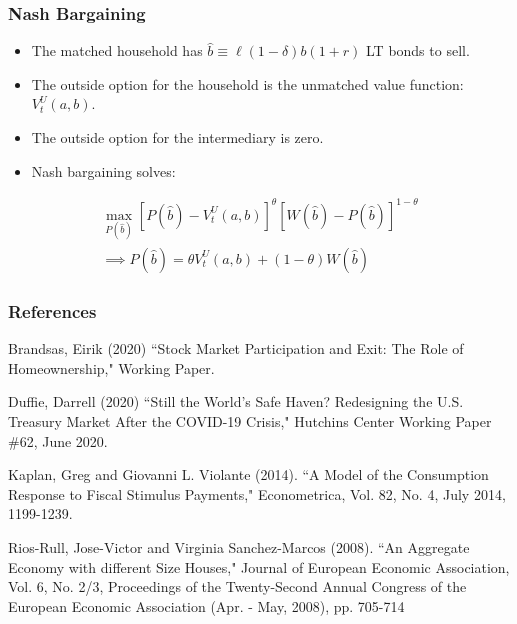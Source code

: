 \documentclass[handout]{beamer}
\begin{document}
\begin{frame}
\frametitle{Nash Bargaining}

\begin{itemize}[<+->]

\item The matched household has $\hat{b} \equiv \ell(1-\delta)b(1+r)$ LT bonds to sell.

\bigskip

\item The outside option for the household is the unmatched value function: $V_t^U(a, b)$.

\bigskip

\item The outside option for the intermediary is zero. 

\bigskip

\item Nash bargaining solves:

\end{itemize}

\begin{align*}
\max_{P(\hat{b})} [P(\hat{b}) - V_t^U(a, b)]^\theta [ W(\hat{b}) - P(\hat{b})]^{1-\theta} \\
\implies P(\hat{b}) = \theta V_t^U(a, b) + (1-\theta) W(\hat{b})
\end{align*}

\end{frame}














\begin{frame}
\frametitle{References}
\scriptsize

Brandsas, Eirik (2020) ``Stock Market Participation and Exit: The Role of Homeownership," Working Paper.

\smallskip

Duffie, Darrell (2020) ``Still the World's Safe Haven? Redesigning the U.S. Treasury Market After the COVID-19 Crisis," Hutchins Center Working Paper \#62, June 2020.

\smallskip

Kaplan, Greg and Giovanni L. Violante (2014). ``A Model of the Consumption Response to Fiscal Stimulus Payments," Econometrica, Vol. 82, No. 4, July 2014, 1199-1239.

\smallskip

Rios-Rull, Jose-Victor and Virginia Sanchez-Marcos (2008). ``An Aggregate Economy with different Size Houses," Journal of European Economic Association, Vol. 6, No. 2/3, Proceedings of the Twenty-Second Annual Congress of the European Economic Association (Apr. - May, 2008), pp. 705-714

\end{frame}
\end{document}
